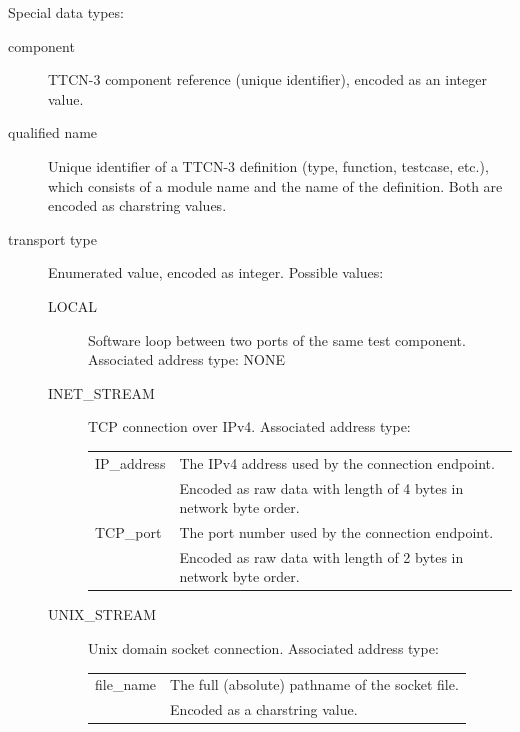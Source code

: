 \documentclass[a4paper,10pt]{article}
\begin{document}
Special data types:
\begin{description}

\item[component] TTCN-3 component reference (unique identifier), encoded as an integer value.

\item[qualified name] Unique identifier of a TTCN-3 definition (type, function, testcase, etc.), which consists of a module name and the name of the definition. Both are encoded as charstring values.

\item[transport type] Enumerated value, encoded as integer. Possible values:

\begin{description}

\item[LOCAL] Software loop between two ports of the same test component. Associated address type: NONE

\item[INET\_STREAM] TCP connection over IPv4. Associated address type:

\begin{tabular}{ll}

IP\_address & The IPv4 address used by the connection endpoint. \\
 & Encoded as raw data with length of 4 bytes in network byte order. \\

TCP\_port & The port number used by the connection endpoint. \\
 & Encoded as raw data with length of 2 bytes in network byte order. \\

\end{tabular}

\item[UNIX\_STREAM] Unix domain socket connection. Associated address type:

\begin{tabular}{ll}

file\_name & The full (absolute) pathname of the socket file. \\
 & Encoded as a charstring value. \\

\end{tabular}

\end{description}

\end{description}
\end{document}
